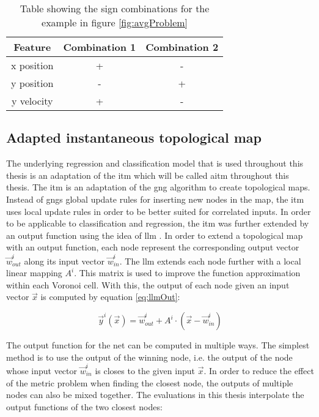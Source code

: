 \begin{table}
	\centering
	\begin{tabular}{|c|c|c|}
		\hline Feature & Combination 1 & Combination 2 \\ 
		\hline x position & + & - \\ 
		\hline y position & - & + \\ 
		\hline y velocity & + & - \\ 
		\hline 
	\end{tabular} 
	\caption{Table showing the sign combinations for the example in figure \ref{fig:avgProblem}}
	\label{tab:signCombinations}
\end{table}

\subsection{Adapted instantaneous topological map \label{sec:ITM}}
The underlying regression and classification model that is used throughout this thesis is an adaptation of the \acrfull{itm} which will be called \acrfull{aitm} throughout this thesis.
The \gls{itm} \cite{itm} is an adaptation of the \gls{gng} \cite{gng} algorithm to create topological maps. Instead of \glspl{gng} global update rules for inserting new nodes in the map, the \gls{itm} uses local update rules in order to be better suited for correlated inputs. 
In order to be applicable to classification and regression, the \gls{itm} was further extended by an output function using the idea of \gls{llm} \cite{LLM}. In order to extend a topological map with an output function, each node represent the corresponding output vector $\vec{w}^i_{out}$ along its input vector $\vec{w}^i_{in}$. The \gls{llm} extends each node further with a local linear mapping $A^i$. This matrix is used to improve the function approximation within each Voronoi cell. With this, the output of each node given an input vector $\vec{x}$ is computed by equation \ref{eq:llmOut}:

\begin{equation}
\vec{y}^i(\vec{x}) = \vec{w}^i_{out} + A^i \cdot (\vec{x}-\vec{w}^i_{in})
\label{eq:llmOut}
\end{equation}

The output function for the net can be computed in multiple ways. The simplest method is to use the output of the winning node, i.e. the output of the node whose input vector $\vec{w}^i_{in}$ is closes to the given input $\vec{x}$. In order to reduce the effect of the metric problem when finding the closest node, the outputs of multiple nodes can also be mixed together. The evaluations in this thesis interpolate the output functions of the two closest nodes:

